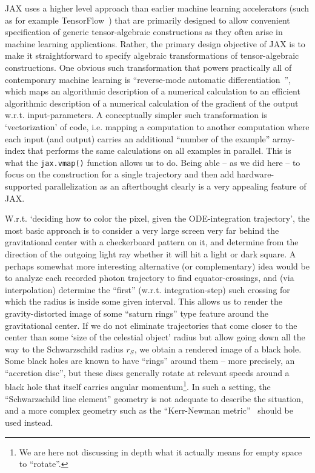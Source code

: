 \documentclass[twocolumn]{article}
\begin{document}
JAX uses a higher level approach than earlier machine learning
accelerators (such as for example TensorFlow~\cite{tensorflow2016}) that are
primarily designed to allow convenient specification of generic
tensor-algebraic constructions as they often arise in machine learning
applications. Rather, the primary design objective of JAX is to make
it straightforward to specify algebraic transformations of
tensor-algebraic constructions. One obvious such transformation that
powers practically all of contemporary machine learning is
``reverse-mode automatic differentiation~\cite{speelpenning1980compiling}'',
which maps an algorithmic description of a numerical calculation to an
efficient algorithmic description of a numerical calculation of the
gradient of the output w.r.t. input-parameters. A conceptually simpler
such transformation is `vectorization' of code, i.e. mapping a
computation to another computation where each input (and output)
carries an additional ``number of the example'' array-index that
performs the same calculations on all examples in parallel.
This is what the \texttt{jax{.}vmap()} function allows us to do.
Being able -- as we did here -- to focus on the construction
for a single trajectory and then add hardware-supported parallelization
as an afterthought clearly is a very appealing feature of JAX.

W.r.t. `deciding how to color the pixel, given the ODE-integration
trajectory', the most basic approach is to consider a very large
screen very far behind the gravitational center with a checkerboard
pattern on it, and determine from the direction of the outgoing light
ray whether it will hit a light or dark square. A perhaps somewhat
more interesting alternative (or complementary) idea would be to
analyze each recorded photon trajectory to find equator-crossings, and
(via interpolation) determine the ``first'' (w.r.t. integration-step)
such crossing for which the radius is inside some given interval. This
allows us to render the gravity-distorted image of some ``saturn
rings'' type feature around the gravitational center. If we do not
eliminate trajectories that come closer to the center than some `size
of the celestial object' radius but allow going down all the way to
the Schwarzschild radius $r_S$, we obtain a rendered image of a black
hole. Some black holes are known to have ``rings'' around them -- more
precisely, an ``accretion disc'', but these discs generally rotate at
relevant speeds around a black hole that itself carries angular
momentum\footnote{We are here not discussing in depth what it actually
means for empty space to ``rotate''.}. In such a setting, the
``Schwarzschild line element'' geometry is not adequate to describe
the situation, and a more complex geometry such as the ``Kerr-Newman
metric''~\cite{kerr1963gravitational,newman1965note}
should be used instead.
\end{document}
